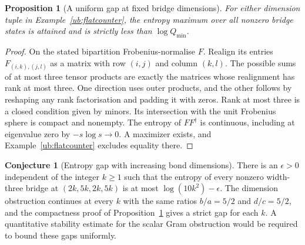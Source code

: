 \documentclass[aps,pra,onecolumn,superscriptaddress,nofootinbib,10pt]{revtex4-2}
\newtheorem{proposition}[theorem]{Proposition}
\theoremstyle{definition}
\newtheorem{conjecture}[theorem]{Conjecture}
\theoremstyle{remark}
\begin{document}
\begin{proposition}[A uniform gap at fixed bridge dimensions]\label{ub:compact}
For either dimension tuple in Example~\ref{ub:flatcounter}, the entropy
maximum over all nonzero bridge states is attained and is strictly
less than $\log Q_{\min}$.
\end{proposition}
\begin{proof}
On the stated bipartition Frobenius-normalise $F$. Realign its entries
$F_{(i,k),(j,l)}$ as a matrix with row $(i,j)$ and column $(k,l)$.
The possible sums of at most three tensor products are exactly the
matrices whose realignment has rank at most three. One direction
uses outer products, and the other follows by reshaping any rank
factorisation and padding it with zeros. Rank at most three is a
closed condition given by minors. Its intersection with the unit
Frobenius sphere is compact and nonempty. The entropy of $FF^\dagger$
is continuous, including at eigenvalue zero by $-s\log s\to0$.
A maximizer exists, and Example~\ref{ub:flatcounter} excludes
equality there.
\end{proof}

\begin{conjecture}[Entropy gap with increasing bond dimensions]\label{ub:uniform}
There is an $\epsilon>0$ independent of the integer $k\ge1$ such
that the entropy of every nonzero width-three bridge at
$(2k,5k,2k,5k)$ is at most $\log(10k^2)-\epsilon$. The dimension obstruction continues at every
$k$ with the same ratios $b/a=5/2$ and $d/c=5/2$, and the
compactness proof of Proposition~\ref{ub:compact} gives a strict gap
for each $k$. A quantitative stability estimate for the scalar
Gram obstruction would be required to bound these gaps uniformly.
\end{conjecture}
\end{document}
